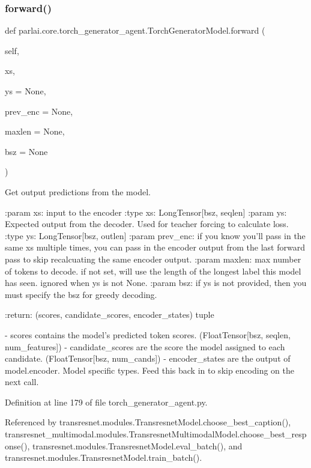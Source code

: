\subsubsection{\texorpdfstring{forward()}{forward()}}
{\footnotesize\ttfamily def parlai.\+core.\+torch\+\_\+generator\+\_\+agent.\+Torch\+Generator\+Model.\+forward (\begin{DoxyParamCaption}\item[{}]{self,  }\item[{}]{xs,  }\item[{}]{ys = {\ttfamily None},  }\item[{}]{prev\+\_\+enc = {\ttfamily None},  }\item[{}]{maxlen = {\ttfamily None},  }\item[{}]{bsz = {\ttfamily None} }\end{DoxyParamCaption})}

\begin{DoxyVerb}Get output predictions from the model.

:param xs:
    input to the encoder
:type xs:
    LongTensor[bsz, seqlen]
:param ys:
    Expected output from the decoder. Used
    for teacher forcing to calculate loss.
:type ys:
    LongTensor[bsz, outlen]
:param prev_enc:
    if you know you'll pass in the same xs multiple times, you can pass
    in the encoder output from the last forward pass to skip
    recalcuating the same encoder output.
:param maxlen:
    max number of tokens to decode. if not set, will use the length of
    the longest label this model has seen. ignored when ys is not None.
:param bsz:
    if ys is not provided, then you must specify the bsz for greedy
    decoding.

:return:
    (scores, candidate_scores, encoder_states) tuple

    - scores contains the model's predicted token scores.
      (FloatTensor[bsz, seqlen, num_features])
    - candidate_scores are the score the model assigned to each candidate.
      (FloatTensor[bsz, num_cands])
    - encoder_states are the output of model.encoder. Model specific types.
      Feed this back in to skip encoding on the next call.
\end{DoxyVerb}
 

Definition at line 179 of file torch\+\_\+generator\+\_\+agent.\+py.



Referenced by transresnet.\+modules.\+Transresnet\+Model.\+choose\+\_\+best\+\_\+caption(), transresnet\+\_\+multimodal.\+modules.\+Transresnet\+Multimodal\+Model.\+choose\+\_\+best\+\_\+response(), transresnet.\+modules.\+Transresnet\+Model.\+eval\+\_\+batch(), and transresnet.\+modules.\+Transresnet\+Model.\+train\+\_\+batch().

